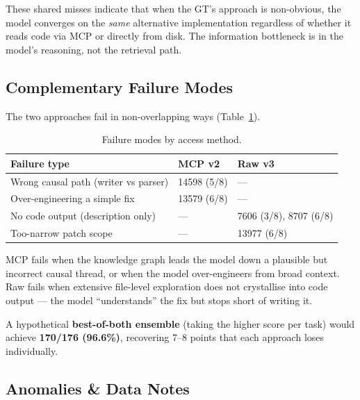 \noindent
These shared misses indicate that when the GT's approach is
non-obvious, the model converges on the \emph{same} alternative
implementation regardless of whether it reads code via MCP or
directly from disk.  The information bottleneck is in the model's
reasoning, not the retrieval path.

\subsection{Complementary Failure Modes}\label{sec:complementary}

The two approaches fail in non-overlapping ways
(Table~\ref{tab:fail-modes}).

\begin{table}[h]
\centering
\caption{Failure modes by access method.}\label{tab:fail-modes}
\begin{tabular}{lll}
\toprule
\textbf{Failure type} & \textbf{MCP v2} & \textbf{Raw v3} \\
\midrule
Wrong causal path (writer vs parser) & 14598 (5/8)  & --- \\
Over-engineering a simple fix        & 13579 (6/8)  & --- \\
No code output (description only)    & ---           & 7606 (3/8), 8707 (6/8) \\
Too-narrow patch scope               & ---           & 13977 (6/8) \\
\bottomrule
\end{tabular}
\end{table}

\noindent
MCP fails when the knowledge graph leads the model down a plausible
but incorrect causal thread, or when the model over-engineers from
broad context.
Raw fails when extensive file-level exploration does not
crystallise into code output --- the model ``understands'' the fix but
stops short of writing it.

A hypothetical \textbf{best-of-both ensemble} (taking the higher score
per task) would achieve \textbf{170/176 (96.6\%)}, recovering 7--8
points that each approach loses individually.

\subsection{Anomalies \& Data Notes}\label{sec:anomalies}

